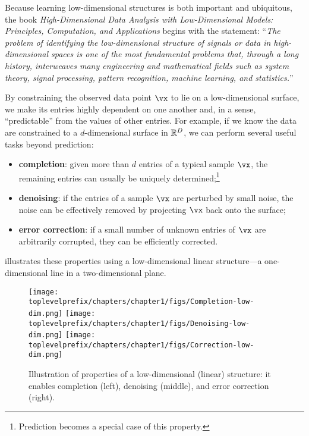 \documentclass[../../book-main.tex]{subfiles}
\begin{document}
Because learning low-dimensional structures is both important and ubiquitous, the book \textit{High-Dimensional Data Analysis with Low-Dimensional Models: Principles, Computation, and Applications} \cite{Wright-Ma-2022} begins with the statement: ``\textit{The problem of identifying the low-dimensional structure of signals or data in high-dimensional spaces is one of the most fundamental problems that, through a long history, interweaves many engineering and mathematical fields such as system theory, signal processing, pattern recognition, machine learning, and statistics.}''

By constraining the observed data point $\vx$ to lie on a low-dimensional surface, we make its entries highly dependent on one another and, in a sense, ``predictable'' from the values of other entries. For example, if we know the data are constrained to a $d$-dimensional surface in $\mathbb{R}^D$, we can perform several useful tasks beyond prediction:
\begin{itemize}
    \item \textbf{completion}: given more than $d$ entries of a typical sample $\vx$, the remaining entries can usually be uniquely determined;\footnote{Prediction becomes a special case of this property.}
    \item \textbf{denoising}: if the entries of a sample $\vx$ are perturbed by small noise, the noise can be effectively removed by projecting $\vx$ back onto the surface;
    \item \textbf{error correction}: if a small number of unknown entries of $\vx$ are arbitrarily corrupted, they can be efficiently corrected.
\end{itemize}
 illustrates these properties using a low-dimensional linear structure---a one-dimensional line in a two-dimensional plane.

\begin{figure}
    \centering
    \texttt{[image: \\toplevelprefix/chapters/chapter1/figs/Completion-low-dim.png]}     
    \texttt{[image: \\toplevelprefix/chapters/chapter1/figs/Denoising-low-dim.png]} 
    \texttt{[image: \\toplevelprefix/chapters/chapter1/figs/Correction-low-dim.png]} 
    \caption{Illustration of properties of a low-dimensional (linear) structure: it enables completion (left), denoising (middle), and error correction (right).}
    \label{fig:low-dim-properties}
\end{figure}
\end{document}
